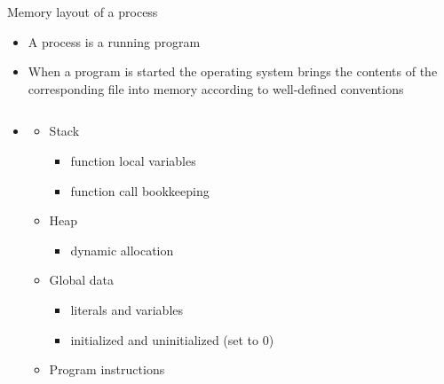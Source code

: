 \begin{frame}{Memory layout of a process}

  \begin{itemize}
  \item A process is a running program
  \item When a program is started the operating system brings the contents of
    the corresponding file into memory according to well-defined conventions
  \end{itemize}

  \begin{columns}
    \begin{column}{.7\textwidth}
      \begin{itemize}
        \item[]
      \begin{itemize}
      \item Stack
        \begin{itemize}
        \item function local variables
        \item function call bookkeeping
        \end{itemize}
      \item Heap
        \begin{itemize}
        \item dynamic allocation
        \end{itemize}
      \item Global data
        \begin{itemize}
        \item literals and variables
        \item initialized and uninitialized (set to 0)
        \end{itemize}
      \item Program instructions
      \end{itemize}
    \end{itemize}
  \end{column}


\end{columns}
\end{frame}
